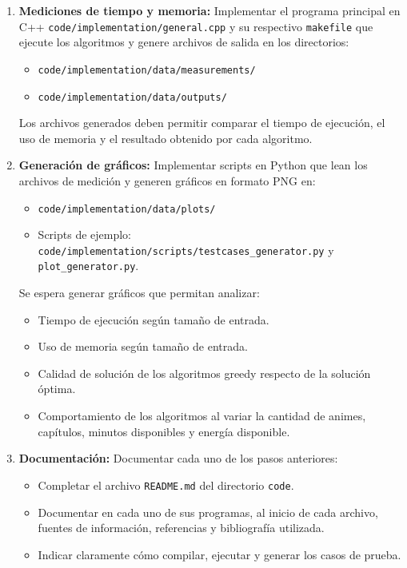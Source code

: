 \begin{enumerate}[(1)]
    \item \textbf{Mediciones de tiempo y memoria:} Implementar el programa principal en C++ \texttt{code/implementation/general.cpp} y su respectivo \texttt{makefile} que ejecute los algoritmos y genere archivos de salida en los directorios:

    \begin{itemize}
        \item \texttt{code/implementation/data/measurements/}
        \item \texttt{code/implementation/data/outputs/}
    \end{itemize}

    Los archivos generados deben permitir comparar el tiempo de ejecución, el uso de memoria y el resultado obtenido por cada algoritmo.

    \item \textbf{Generación de gráficos:} Implementar scripts en Python que lean los archivos de medición y generen gráficos en formato PNG en:

    \begin{itemize}
        \item \texttt{code/implementation/data/plots/}
        \item Scripts de ejemplo: \texttt{code/implementation/scripts/testcases\_generator.py} y \texttt{plot\_generator.py}.
    \end{itemize}

    Se espera generar gráficos que permitan analizar:

    \begin{itemize}
        \item Tiempo de ejecución según tamaño de entrada.
        \item Uso de memoria según tamaño de entrada.
        \item Calidad de solución de los algoritmos greedy respecto de la solución óptima.
        \item Comportamiento de los algoritmos al variar la cantidad de animes, capítulos, minutos disponibles y energía disponible.
    \end{itemize}

    \item \textbf{Documentación:} Documentar cada uno de los pasos anteriores:

    \begin{itemize}
        \item Completar el archivo \texttt{README.md} del directorio \texttt{code}.
        \item Documentar en cada uno de sus programas, al inicio de cada archivo, fuentes de información, referencias y bibliografía utilizada.
        \item Indicar claramente cómo compilar, ejecutar y generar los casos de prueba.
    \end{itemize}
\end{enumerate}

